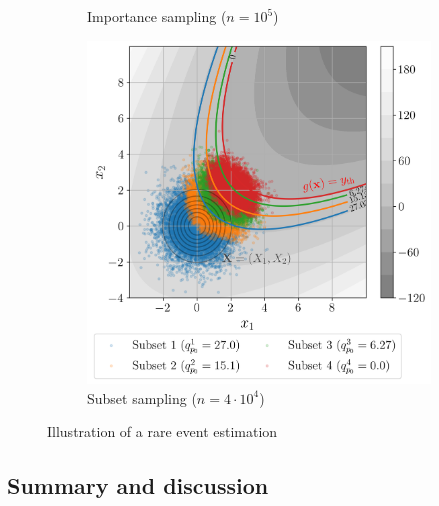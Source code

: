 \begin{figure}[ht]
\begin{subfigure}[b]{0.32\textwidth}
        \caption{Importance sampling ($n=10^5$)}
    \end{subfigure}
    \hfill
    \begin{subfigure}[b]{0.32\textwidth}
        \centering
        \includegraphics[width=\textwidth]{../numerical_experiments/chapter1/figures/reliability_SS_illustration.png}
        \caption{Subset sampling ($n=4\cdot10^4$)}
    \end{subfigure}
       \caption{Illustration of a rare event estimation}
       \label{fig:simulation_reliability}
\end{figure}



\subsection{Summary and discussion}



